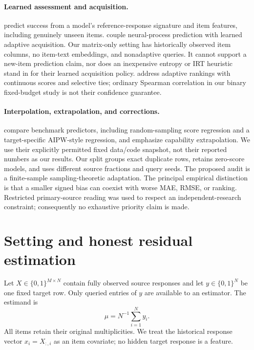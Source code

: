 \documentclass{article}
\begin{document}
\paragraph{Learned assessment and acquisition.}
\citet{pacchiardi2024hundredinstances} predict success from a model's reference-response signature and item features, including genuinely unseen items. \citet{li2024activeevaluation} couple neural-process prediction with learned adaptive acquisition. Our matrix-only setting has historically observed item columns, no item-text embeddings, and nonadaptive queries. It cannot support a new-item prediction claim, nor does an inexpensive entropy or IRT heuristic stand in for their learned acquisition policy. \citet{balkir2026confidentrankings} address adaptive rankings with continuous scores and selective ties; ordinary Spearman correlation in our binary fixed-budget study is not their confidence guarantee.

\paragraph{Interpolation, extrapolation, and corrections.}
\citet{zhang2025missesthemark} compare benchmark predictors, including random-sampling score regression and a target-specific AIPW-style regression, and emphasize capability extrapolation. We use their explicitly permitted fixed data/code snapshot, not their reported numbers as our results. Our split groups exact duplicate rows, retains zero-score models, and uses different source fractions and query seeds. The proposed audit is a finite-sample sampling-theoretic adaptation. The principal empirical distinction is that a smaller signed bias can coexist with worse MAE, RMSE, or ranking. Restricted primary-source reading was used to respect an independent-research constraint; consequently no exhaustive priority claim is made.

\section{Setting and honest residual estimation}\label{sec:method}
Let $X\in\{0,1\}^{M\times N}$ contain fully observed source responses and let $y\in\{0,1\}^N$ be one fixed target row. Only queried entries of $y$ are available to an estimator. The estimand is
\begin{equation}\label{eq:target}
\mu=N^{-1}\sum_{i=1}^N y_i.
\end{equation}
All items retain their original multiplicities. We treat the historical response vector $x_i=X_{:,i}$ as an item covariate; no hidden target response is a feature.
\end{document}
